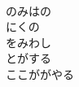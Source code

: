 \documentclass[10pt,b5j]{tarticle} %
\begin{document}
\begin{enumerate}
\begin{minipage}[c]{\blocksize}
        \vspace{\linespace}
        \item~\\
        のみはの\\
        にくの\\
        をみわし\\
        とがする\\
        ここががやる
    
    \end{minipage}
\end{enumerate} %
\end{document}
